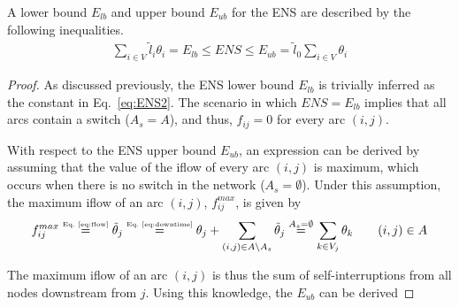 \begin{lemma} \label{lem:Eminmax}
A lower bound $E_{lb}$ and upper bound $E_{ub}$ for the ENS are described by the following inequalities.
 	\begin{align} 
		\displaystyle \sum_{i \in V}{\tilde{l}_i\theta_{i}} = E_{lb} \leqslant ENS \leqslant E_{ub} = \tilde{l}_0\sum_{i \in V}{\theta_{i}} \label{eq:Eminmax}
	\end{align}
\end{lemma}
\begin{proof}
As discussed previously, the ENS lower bound $E_{lb}$ is trivially inferred as the constant in Eq.~\eqref{eq:ENS2}. The scenario in which $ENS = E_{lb}$ implies that all arcs contain a switch ($A_{s} = A$), and thus, $f_{ij} = 0$ for every arc $(i,j)$.

With respect to the ENS upper bound $E_{ub}$, an expression can be derived by assuming that the value of the iflow of every arc $(i,j)$ is maximum, which occurs when there is no switch in the network ($A_{s} = \emptyset$). Under this assumption, the maximum iflow of an arc $(i,j)$, $f_{ij}^{max}$, is given by
 	\begin{align} \label{eq:maxflow}
		f^{max}_{ij} \stackrel{\mbox{\tiny Eq.~\ref{eq:flow}}}{=} \tilde{\theta}_{j} \stackrel{\mbox{\tiny Eq.~\ref{eq:downtime}}}{=} \theta_j + \sum_{(i,j) \in A \setminus A_{s}}{\tilde{\theta}_{j}} \stackrel{A_{s} = \emptyset}{=} \sum_{k \in V_j}{\theta_{k}} \qquad (i,j) \in A
	\end{align}

The maximum iflow of an arc $(i,j)$ is thus the sum of self-interruptions from all nodes downstream from $j$. Using this knowledge, the $E_{ub}$ can be derived


\end{proof}
